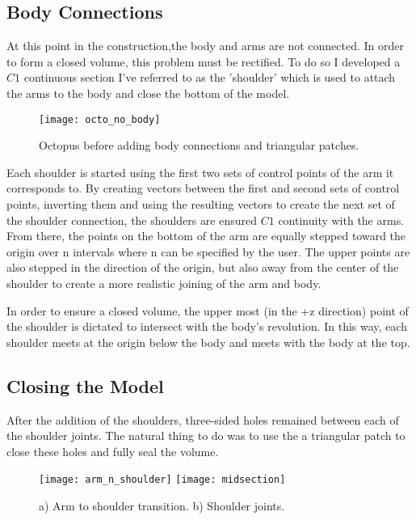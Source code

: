 \documentclass[twocolumn]{article}
\begin{document}
\subsection{Body Connections} 

At this point in the construction,the body and arms are not connected. In order to form a closed volume, this problem must be rectified. To do so I developed a $C1$ continuous section I've referred to as the 'shoulder' which is used to attach the arms to the body and close the bottom of the model. 

\begin{figure}[h!]
\begin{center}
\texttt{[image: octo\_no\_body]}
\caption{Octopus before adding body connections and triangular patches.}
\end{center}
\end{figure}

Each shoulder is started using the first two sets of control points of the arm it corresponds to. By creating vectors between the first and second sets of control points, inverting them and using the resulting vectors to create the next set of the shoulder connection, the shoulders are ensured $C1$ continuity with the arms. From there, the points on the bottom of the arm are equally stepped toward the origin over n intervals where n can be specified by the user. The upper points are also stepped in the direction of the origin, but also away from the center of the shoulder to create a more realistic joining of the arm and body. 

In order to ensure a closed volume, the upper most (in the +z direction) point of the shoulder is dictated to intersect with the body's revolution. In this way, each shoulder meets at the origin below the body and meets with the body at the top. 

\subsection{Closing the Model}

After the addition of the shoulders, three-sided holes remained between each of the shoulder joints. The natural thing to do was to use the a triangular patch to close these holes and fully seal the volume. 

\begin{figure}[h!]
\begin{center}
\texttt{[image: arm\_n\_shoulder]}
\texttt{[image: midsection]}
\caption{a) Arm to shoulder transition. b) Shoulder joints.}
\end{center}
\end{figure}
\end{document}
